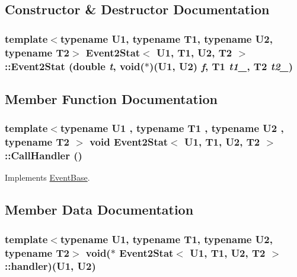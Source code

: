 \subsection{Constructor \& Destructor Documentation}
\hypertarget{classEvent2Stat_ad167681d8833e8300e76e60d8766b81}{
\subsubsection[{Event2Stat}]{\setlength{\rightskip}{0pt plus 5cm}template$<$typename U1, typename T1, typename U2, typename T2$>$ {\bf Event2Stat}$<$ U1, T1, U2, T2 $>$::{\bf Event2Stat} (double {\em t}, \/  void($\ast$)(U1, U2) {\em f}, \/  T1 {\em t1\_}, \/  T2 {\em t2\_})}}
\label{classEvent2Stat_ad167681d8833e8300e76e60d8766b81}




\subsection{Member Function Documentation}
\hypertarget{classEvent2Stat_84e6e9e412678507da3b2bde8e6a157a}{
\subsubsection[{CallHandler}]{\setlength{\rightskip}{0pt plus 5cm}template$<$typename U1 , typename T1 , typename U2 , typename T2 $>$ void {\bf Event2Stat}$<$ U1, T1, U2, T2 $>$::CallHandler ()}}
\label{classEvent2Stat_84e6e9e412678507da3b2bde8e6a157a}




Implements \hyperlink{classEventBase_121ca64dec88c8d9589c064b0060d037}{EventBase}.

\subsection{Member Data Documentation}
\hypertarget{classEvent2Stat_c376cfc98a16f3365e21be171d8d491a}{
\subsubsection[{handler}]{\setlength{\rightskip}{0pt plus 5cm}template$<$typename U1, typename T1, typename U2, typename T2$>$ void($\ast$ {\bf Event2Stat}$<$ U1, T1, U2, T2 $>$::{\bf handler})(U1, U2)}}
\label{classEvent2Stat_c376cfc98a16f3365e21be171d8d491a}


